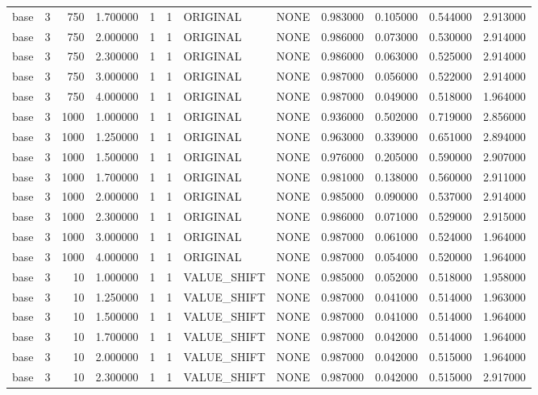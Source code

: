 \begin{tabular}{lrrrllllrrrr}
base & 3 & 750 & 1.700000 & 1 & 1 & ORIGINAL & NONE & 0.983000 & 0.105000 & 0.544000 & 2.913000 \\
base & 3 & 750 & 2.000000 & 1 & 1 & ORIGINAL & NONE & 0.986000 & 0.073000 & 0.530000 & 2.914000 \\
base & 3 & 750 & 2.300000 & 1 & 1 & ORIGINAL & NONE & 0.986000 & 0.063000 & 0.525000 & 2.914000 \\
base & 3 & 750 & 3.000000 & 1 & 1 & ORIGINAL & NONE & 0.987000 & 0.056000 & 0.522000 & 2.914000 \\
base & 3 & 750 & 4.000000 & 1 & 1 & ORIGINAL & NONE & 0.987000 & 0.049000 & 0.518000 & 1.964000 \\
base & 3 & 1000 & 1.000000 & 1 & 1 & ORIGINAL & NONE & 0.936000 & 0.502000 & 0.719000 & 2.856000 \\
base & 3 & 1000 & 1.250000 & 1 & 1 & ORIGINAL & NONE & 0.963000 & 0.339000 & 0.651000 & 2.894000 \\
base & 3 & 1000 & 1.500000 & 1 & 1 & ORIGINAL & NONE & 0.976000 & 0.205000 & 0.590000 & 2.907000 \\
base & 3 & 1000 & 1.700000 & 1 & 1 & ORIGINAL & NONE & 0.981000 & 0.138000 & 0.560000 & 2.911000 \\
base & 3 & 1000 & 2.000000 & 1 & 1 & ORIGINAL & NONE & 0.985000 & 0.090000 & 0.537000 & 2.914000 \\
base & 3 & 1000 & 2.300000 & 1 & 1 & ORIGINAL & NONE & 0.986000 & 0.071000 & 0.529000 & 2.915000 \\
base & 3 & 1000 & 3.000000 & 1 & 1 & ORIGINAL & NONE & 0.987000 & 0.061000 & 0.524000 & 1.964000 \\
base & 3 & 1000 & 4.000000 & 1 & 1 & ORIGINAL & NONE & 0.987000 & 0.054000 & 0.520000 & 1.964000 \\
base & 3 & 10 & 1.000000 & 1 & 1 & VALUE_SHIFT & NONE & 0.985000 & 0.052000 & 0.518000 & 1.958000 \\
base & 3 & 10 & 1.250000 & 1 & 1 & VALUE_SHIFT & NONE & 0.987000 & 0.041000 & 0.514000 & 1.963000 \\
base & 3 & 10 & 1.500000 & 1 & 1 & VALUE_SHIFT & NONE & 0.987000 & 0.041000 & 0.514000 & 1.964000 \\
base & 3 & 10 & 1.700000 & 1 & 1 & VALUE_SHIFT & NONE & 0.987000 & 0.042000 & 0.514000 & 1.964000 \\
base & 3 & 10 & 2.000000 & 1 & 1 & VALUE_SHIFT & NONE & 0.987000 & 0.042000 & 0.515000 & 1.964000 \\
base & 3 & 10 & 2.300000 & 1 & 1 & VALUE_SHIFT & NONE & 0.987000 & 0.042000 & 0.515000 & 2.917000 \\

\end{tabular}
